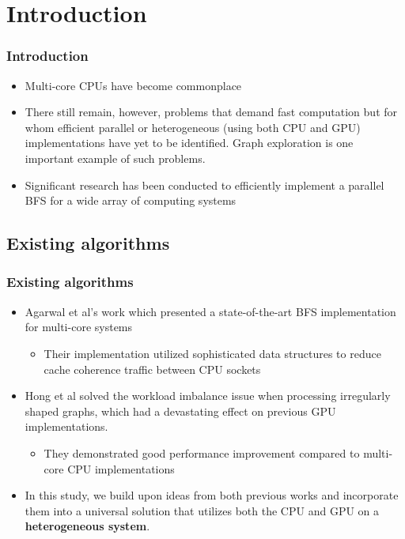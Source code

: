 \documentclass{beamer}
\begin{document}
\section{Introduction}
\begin{frame}
\frametitle{Introduction}
\begin{itemize}
\item Multi-core CPUs have become commonplace
\item There still remain, however, problems that demand fast computation but for whom efficient parallel or heterogeneous (using both CPU and GPU) implementations have yet to be identified. Graph exploration
is one important example of such problems.
\item Significant research has been
conducted to efficiently implement a parallel BFS for a wide array of computing systems
\end{itemize}

\end{frame}
\subsection{Existing algorithms}

\begin{frame}
\frametitle{Existing algorithms}
\begin{itemize}
\item Agarwal et al’s work which presented a state-of-the-art BFS implementation for multi-core systems

	\begin{itemize}
		\item Their implementation utilized sophisticated data structures to reduce cache coherence traffic between CPU sockets
	\end{itemize}

\item Hong et al solved the workload imbalance
issue when processing irregularly shaped graphs, which had a devastating effect on previous GPU implementations. 

	\begin{itemize}
		\item They demonstrated good performance improvement compared to
multi-core CPU implementations
	\end{itemize}

\item In this study, we build upon ideas from both previous works and incorporate them into a universal solution that utilizes both the CPU and GPU on a \textbf{heterogeneous system}.
\end{itemize}

\end{frame}
\end{document}
